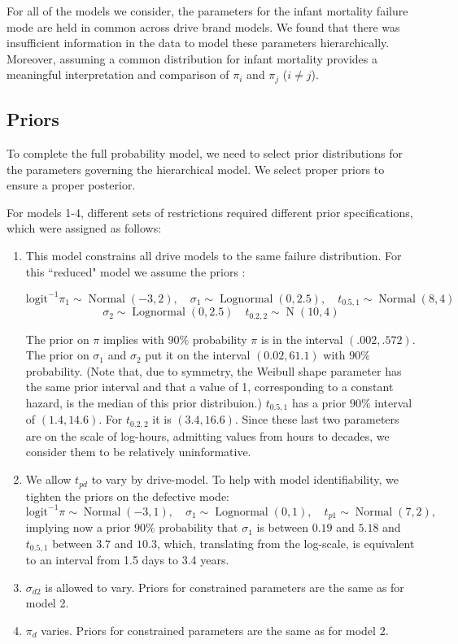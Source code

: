 \documentclass[12pt]{article}
\newcommand{\op}{\operatorname}
\begin{document}
For all of the models we consider, the parameters for the infant mortality failure mode are held in common across drive brand models. We found that there was insufficient information in the data to model these parameters hierarchically.  Moreover, assuming a common distribution for infant mortality provides a meaningful interpretation and comparison of $\pi_i$ and $\pi_j$ ($i \neq j$). 

\subsection{Priors}
To complete the full probability model, we need to select prior distributions for the parameters governing the hierarchical model. We select proper priors to ensure a proper posterior.

For models 1-4, different sets of restrictions required different prior specifications, which were assigned as follows:

\begin{enumerate}
\item This model constrains all drive models to the same failure distribution. For this ``reduced" model we assume the priors :

$$\mbox{logit}^{-1}\pi_1 \sim \op{Normal}(-3,2),\quad \sigma_1 \sim \op{Lognormal}(0, 2.5), \quad t_{0.5,1} \sim \op{Normal}(8,4)$$
$$\sigma_2 \sim \op{Lognormal}(0, 2.5) \quad t_{0.2,2} \sim \op{N}(10,4)$$

The prior on $\pi$ implies with $90\%$ probability $\pi$ is in the interval $(.002, .572)$. The prior on $\sigma_1$ and $\sigma_2$ put it on the interval $(0.02, 61.1)$ with $90\%$ probability. (Note that, due to symmetry, the Weibull shape parameter has the same prior interval and that a value of 1, corresponding to a constant hazard, is the median of this prior distribuion.) $t_{0.5,1}$ has a prior $90\%$ interval of $(1.4,14.6)$. For $t_{0.2,2}$ it is $(3.4,16.6)$. Since these last two parameters are on the scale of log-hours, admitting values from hours to decades, we consider them to be relatively uninformative.

\item We allow $t_{pd}$ to vary by drive-model. To help with model identifiability, we tighten the priors on the defective mode:
$$ \mbox{logit}^{-1}\pi \sim \op{Normal}(-3,1),\quad \sigma_1 \sim \op{Lognormal}(0, 1), \quad t_{p1} \sim \op{Normal}(7,2),$$
implying now a prior $90\%$ probability that $\sigma_1$ is between $0.19$ and $5.18$ and $t_{0.5,1}$ between $3.7$ and $10.3$, which, translating from the log-scale, is equivalent to an interval from 1.5 days to 3.4 years.

\item $\sigma_{d2}$ is allowed to vary. Priors for constrained parameters are the same as for model 2.

\item $\pi_d$ varies. Priors for constrained parameters are the same as for model 2.

\end{enumerate}
\end{document}
